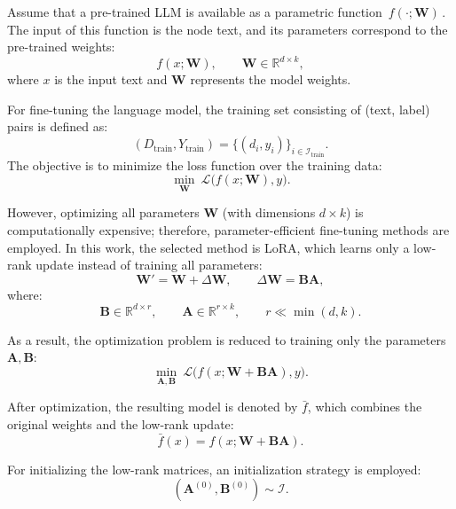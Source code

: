 \documentclass[a4paper,fleqn]{cas-sc}
\begin{document}
Assume that a pre-trained LLM is available as a parametric function $\,f(\cdot;\mathbf{W})\,$. The input of this function is the node text, and its parameters correspond to the pre-trained weights:
\begin{equation}
f(x;\mathbf{W}), \qquad \mathbf{W}\in\mathbb{R}^{d\times k},
\end{equation}
where $x$ is the input text and $\mathbf{W}$ represents the model weights.

For fine-tuning the language model, the training set consisting of (text, label) pairs is defined as:
\begin{equation}
(D_{\text{train}},Y_{\text{train}})=\{(d_i,y_i)\}_{i\in\mathcal{I}_{\text{train}}}.
\end{equation}
The objective is to minimize the loss function over the training data:
\begin{equation}
\min_{\mathbf{W}} \ \mathcal{L}\big(f(x;\mathbf{W}), y\big).
\end{equation}

However, optimizing all parameters $\mathbf{W}$ (with dimensions $d\times k$) is computationally expensive; therefore, parameter-efficient fine-tuning methods are employed. In this work, the selected method is LoRA, which learns only a low-rank update instead of training all parameters:
\begin{equation}
\mathbf{W}'=\mathbf{W}+\Delta\mathbf{W}, \qquad \Delta\mathbf{W}=\mathbf{B}\mathbf{A},
\end{equation}
where:
\begin{equation}
\mathbf{B}\in\mathbb{R}^{d\times r}, \qquad \mathbf{A}\in\mathbb{R}^{r\times k}, \qquad r\ll \min(d,k).
\end{equation}

As a result, the optimization problem is reduced to training only the parameters $\mathbf{A},\mathbf{B}$:
\begin{equation}
\min_{\mathbf{A},\mathbf{B}} \ \mathcal{L}\big(f(x;\mathbf{W}+\mathbf{B}\mathbf{A}),y\big).
\end{equation}

After optimization, the resulting model is denoted by $\bar{f}$, which combines the original weights and the low-rank update:
\begin{equation}
\bar{f}(x)=f(x;\mathbf{W}+\mathbf{B}\mathbf{A}).
\end{equation}

For initializing the low-rank matrices, an initialization strategy is employed:
\begin{equation}
(\mathbf{A}^{(0)},\mathbf{B}^{(0)})\sim \mathcal{I}.
\end{equation}
\end{document}
